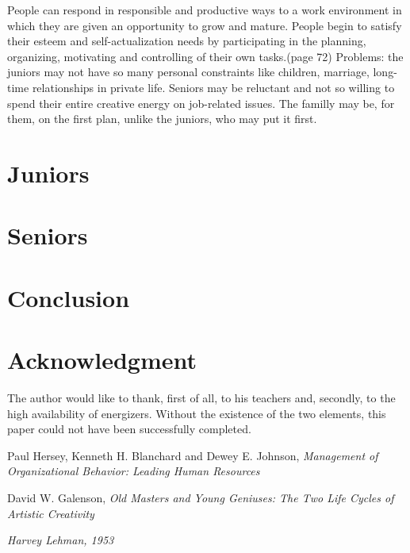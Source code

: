 \documentclass[conference]{IEEEtran}
\begin{document}
\newline\indent
People can respond in responsible and productive ways to a work environment in which they are given an opportunity to grow and mature. People begin to satisfy their esteem and self-actualization needs by participating in the planning, organizing, motivating and controlling of their own tasks.(page 72)
\newline\indent
Problems: the juniors may not have so many personal constraints like children, marriage, long-time relationships in private life. Seniors may be reluctant and not so willing to spend their entire creative energy on job-related issues. The familly may be, for them, on the first plan, unlike the juniors, who may put it first.

\section{Juniors}
\section{Seniors}

\newpage
\section{Conclusion}

\section*{Acknowledgment}
The author would like to thank, first of all, to his teachers and, secondly, to the high availability of energizers. Without the existence of the two elements, this paper could not have been successfully completed. 

\newpage
\begin{thebibliography}{99}


Paul Hersey, Kenneth H. Blanchard and Dewey E. Johnson, \emph{Management of Organizational Behavior: Leading Human Resources}

David W. Galenson, \emph{Old Masters and Young Geniuses: The Two Life Cycles of Artistic Creativity}

\emph{Harvey Lehman, 1953} 

\end{thebibliography}
\end{document}
